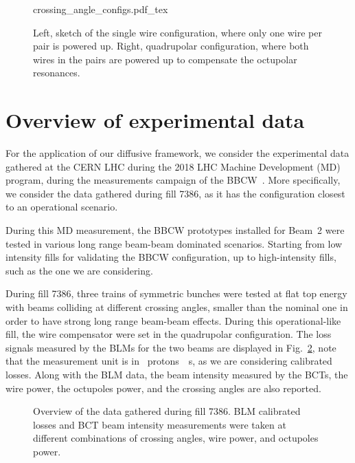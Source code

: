 \begin{figure}[hpt]
    \centering
    \def\svgwidth{1.0\textwidth}
    {crossing_angle_configs.pdf_tex}
    \caption{Left, sketch of the single wire configuration, where only one wire per pair is powered up. Right, quadrupolar configuration, where both wires in the pairs are powered up to compensate the octupolar resonances.}
    \label{fig:wire-configs}
\end{figure}

\section{Overview of experimental data}

For the application of our diffusive framework, we consider the experimental data gathered at the CERN LHC during the 2018 LHC Machine Development (MD) program, during the measurements campaign of the BBCW~\cite{Poyet:2703503}. More specifically, we consider the data gathered during fill 7386, as it has the configuration closest to an operational scenario.

During this MD measurement, the BBCW prototypes installed for Beam~2 were tested in various long range beam-beam dominated scenarios. Starting from low intensity fills for validating the BBCW configuration, up to high-intensity fills, such as the one we are considering. 

During fill 7386, three trains of symmetric bunches were tested at flat top energy with beams colliding at different crossing angles, smaller than the nominal one in order to have strong long range beam-beam effects. During this operational-like fill, the wire compensator were set in the quadrupolar configuration. The loss signals measured by the BLMs for the two beams are displayed in Fig.~\ref{fig:wire-data}, note that the measurement unit is in \SI{}{protons \per s}, as we are considering calibrated losses. Along with the BLM data, the beam intensity measured by the BCTs, the wire power, the octupoles power, and the crossing angles are also reported. 

\begin{figure}[hpt]
    \centering
    \caption{Overview of the data gathered during fill 7386. BLM calibrated losses and BCT beam intensity measurements were taken at different combinations of crossing angles, wire power, and octupoles power.}
    \label{fig:wire-data}
\end{figure}

